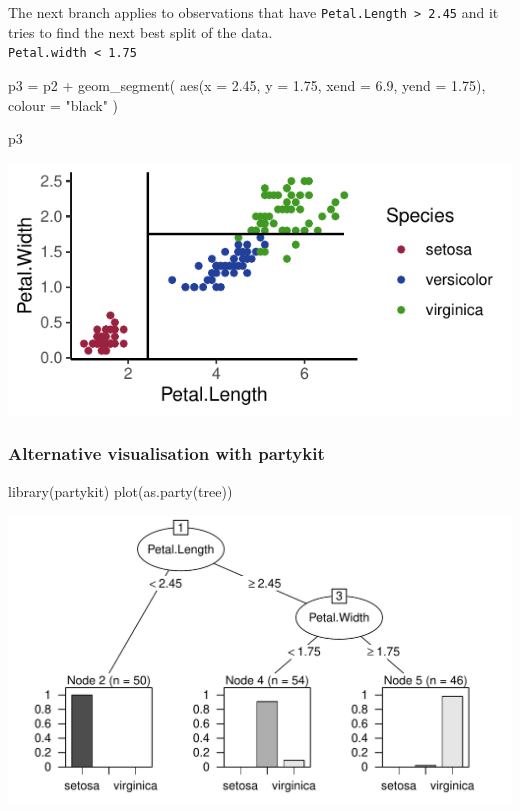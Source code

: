 \documentclass[a4paper]{article}
\begin{document}
The next branch applies to observations that have \lstinline|Petal.Length > 2.45| and it tries to find the next best split of the data.\\
\lstinline|Petal.width < 1.75|
\begin{Schunk}
\begin{Sinput}
p3 = p2 + 
  geom_segment(
    aes(x = 2.45, y = 1.75, 
        xend = 6.9, yend = 1.75),
        colour = "black"
  )

p3
\end{Sinput}


{\centering \includegraphics[width=\maxwidth]{figure/listings-unnamed-chunk-431-1} 

}

\end{Schunk}
\subsubsection{Alternative visualisation with partykit}
\begin{Schunk}
\begin{Sinput}
library(partykit)
plot(as.party(tree))
\end{Sinput}


{\centering \includegraphics[width=\maxwidth]{figure/listings-unnamed-chunk-432-1} 

}

\end{Schunk}
\end{document}
